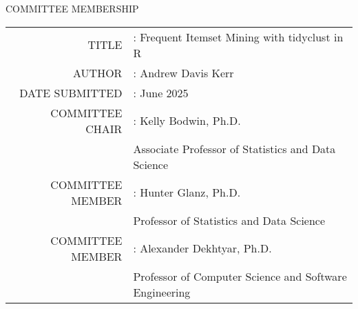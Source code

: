 \begin{center}
COMMITTEE MEMBERSHIP

\vspace{.5in}

\begin{tabular}{r@{}l}
TITLE & : \hspace*{1.5em}Frequent Itemset Mining with tidyclust in R \\[.5in]
AUTHOR & : \hspace*{1.5em}Andrew Davis Kerr \\[.5in]
DATE SUBMITTED & : \hspace*{1.5em}June 2025 \\[2in]
COMMITTEE CHAIR & : \hspace*{1.5em}Kelly Bodwin, Ph.D. \\
 & \hspace*{2.2em}Associate Professor of Statistics and Data Science \\[.5in]
COMMITTEE MEMBER & : \hspace*{1.5em}Hunter Glanz, Ph.D. \\
 & \hspace*{2.2em}Professor of Statistics and Data Science \\[.5in]
COMMITTEE MEMBER & : \hspace*{1.5em}Alexander Dekhtyar, Ph.D. \\
 & \hspace*{2.2em}Professor of Computer Science and Software Engineering \\
\end{tabular}
\end{center}
\clearpage